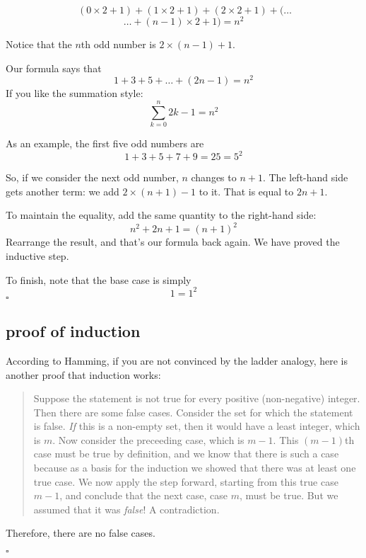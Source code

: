 \documentclass[11pt, oneside]{article}
\begin{document}
\[ \ (0 \times 2 + 1) +  (1 \times 2 + 1) + (2 \times 2 + 1) + (\dots \]
\[ \dots + (n-1) \times 2 + 1) = n^2 \]

Notice that the $n$th odd number is $2 \times (n-1) + 1$.

Our formula says that
\[ 1 + 3 + 5 + \dots + (2n - 1) = n^2 \]
If you like the summation style:
\[ \sum_{k=0}^n 2k - 1 = n^2 \]

As an example, the first five odd numbers are
\[ 1 + 3 + 5 + 7 + 9 = 25 = 5^2 \]

So, if we consider the next odd number, $n$ changes to $n+1$.  The left-hand side gets another term:  we add $2 \times (n+1)-1$ to it.  That is equal to $2n + 1$.

To maintain the equality, add the same quantity to the right-hand side:
\[ n^2 + 2n + 1 = (n+1)^2 \]
Rearrange the result, and that's our formula back again.  We have proved the inductive step.  

To finish, note that the base case is simply
\[ 1 = 1^2 \]
$\square$

\subsection*{proof of induction}

According to Hamming, if you are not convinced by the ladder analogy, here is another proof that induction works:

\begin{quote}Suppose the statement is not true for every positive (non-negative) integer.  Then there are some false cases.  Consider the set for which the statement is false.  \emph{If} this is a non-empty set, then it would have a least integer, which is $m$.  Now consider the preceeding case, which is $m - 1$.  This $(m-1)$th case must be true by definition, and we know that there is such a case because as a basis for the induction we showed that there was at least one true case.  We now apply the step forward, starting from this true case $m-1$, and conclude that the next case, case $m$, must be true.  But we assumed that it was \emph{false}!  A contradiction. \end{quote}

Therefore, there are no false cases.

$\square$
\end{document}
